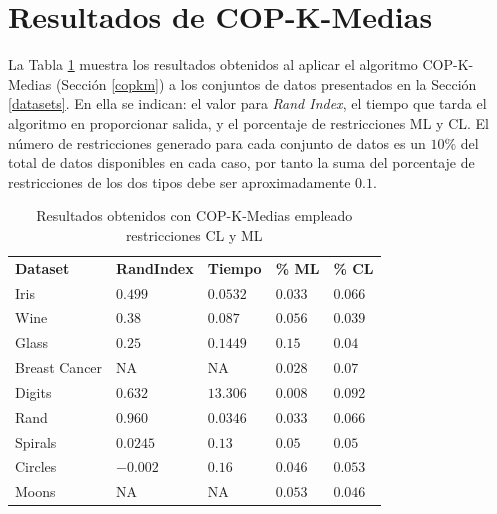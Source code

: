 \section{Resultados de COP-K-Medias}

La Tabla \ref{tab:tabla5} muestra los resultados obtenidos al aplicar el algoritmo COP-K-Medias (Sección \ref{copkm}) a los conjuntos de datos presentados en la Sección \ref{datasets}. En ella se indican: el valor para \textit{Rand Index}, el tiempo que tarda el algoritmo en proporcionar salida, y el porcentaje de restricciones \acs{ML} y \acs{CL}. El número de restricciones generado para cada conjunto de datos es un $10\%$ del total de datos disponibles en cada caso, por tanto la suma del porcentaje de restricciones de los dos tipos debe ser aproximadamente $0.1$.

\begin{table}[!h]
	\centering
	\setlength{\arrayrulewidth}{1mm}
	\setlength{\tabcolsep}{10pt}
	\renewcommand{\arraystretch}{1}
	
	\begin{tabular}{ >{\centering\arraybackslash}m{2.5cm}  >{\centering\arraybackslash}m{1.8cm}>{\centering\arraybackslash}m{1.5cm}>{\centering\arraybackslash}m{1.2cm}>{\centering\arraybackslash}m{1.2cm}}
		\hline
		\rowcolor{black}
		\multicolumn{5}{c}{\bf \color{white}{Resultados de COP-K-Medias con restricciones CL y ML}}\\
		\hline
		\rowcolor{gray!50}
		\textbf{Dataset} & \textbf{RandIndex} & \textbf{Tiempo} & \textbf{\% ML} & \textbf{\% CL}  \\
		Iris & $0.499$ & $0.0532$ & $0.033$ & $0.066$ \\
		Wine & $0.38$ & $0.087$ & $0.056$ & $0.039$ \\
		Glass  & $0.25$ & $0.1449$ & $0.15$ & $0.04$ \\
		Breast Cancer & NA & NA & $0.028$ & $0.07$ \\ 
		Digits & $0.632$ & $13.306$ & $0.008$ & $0.092$ \\
		Rand & $0.960$ & $0.0346$ & $0.033$ & $0.066$ \\
		Spirals & $0.0245$ & $0.13$ & $0.05$ & $0.05$ \\
		Circles & $-0.002$ & $0.16$ & $0.046$ & $0.053$ \\
		Moons & NA & NA & $0.053$ & $0.046$ \\
		\hline
		
	\end{tabular}
	\caption{Resultados obtenidos con COP-K-Medias empleado restricciones \acs{CL} y \acs{ML}}
	\label{tab:tabla5}
\end{table}

